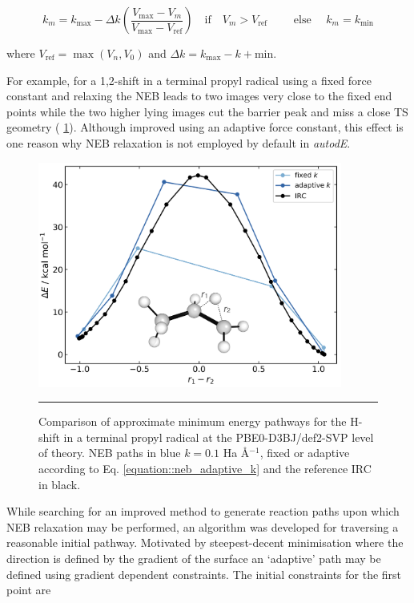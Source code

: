 \documentclass[../../main.tex]{subfiles}
\begin{document}
\begin{equation}
	k_m = 
		k_\text{max} - \Delta k \left(\frac{V_\text{max} - V_m}{V_\text{max} - V_\text{ref}} \right) \quad \text{if}\quad V_m > V_\text{ref} \qquad\text{  else  }\quad
		k_m = k_\text{min}  %
\label{equation::neb_adaptive_k}
\end{equation}


where $V_\text{ref} = \max(V_n, V_0)$ and $\Delta k = k_\text{max} - k+\text{min}$.

For example, for a 1,2-shift in a terminal propyl radical using a fixed force constant and relaxing the NEB leads to two images very close to the fixed end points while the two higher lying images cut the barrier peak and miss a close TS geometry (\figurename{ \ref{fig::ade_further_1}}). Although improved using an adaptive force constant, this effect is one reason why NEB relaxation is not employed by default in \emph{autodE}.

\begin{figure}[h!]
	\vspace{0.4cm}
	\centering
	\includegraphics[width=10cm]{5/further/figs/fig1/fig1.png}
	\vspace{0.4cm}
	\hrule
	\caption{Comparison of approximate minimum energy pathways for the H-shift in a terminal propyl radical at the PBE0-D3BJ/def2-SVP level of theory. NEB paths in blue $k = 0.1$ Ha \AA$^{-1}$, fixed or adaptive according to Eq. \eqref{equation::neb_adaptive_k} and the reference IRC in black.}
	\label{fig::ade_further_1}
\end{figure}


While searching for an improved method to generate reaction paths upon which NEB relaxation may be performed, an algorithm was developed for traversing a reasonable initial pathway. Motivated by steepest-decent minimisation where the direction is defined by the gradient of the surface an `adaptive' path may be defined using gradient dependent constraints. The initial constraints for the first point are
\end{document}
